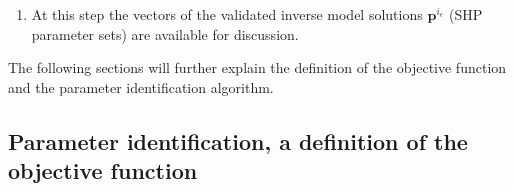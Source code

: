 \documentclass[review]{myarticle}
\newenvironment{lineq}
    {\begin{linenomath*}
    \begin{equation}
    }
    { 
    \end{equation} 
    \end{linenomath*}
    }
\renewcommand{\vec}{\mathbf}
\newcommand{\subscript}[2]{$#1 _ #2$}
\begin{document}
\begin{enumerate}[label=({\bf \roman*})]
\begin{lineq}
\begin{split}
\varepsilon^{r_f} &= 10^{-3} \; \mbox{cm} \quad  \forall r_f > 0, \\
t_{init}^{r_f} &=  10^{-8} \; \mbox{hrs} \quad  \forall r_f > 0.
\end{split}
\end{lineq}
If $r_f > 0$, then the nonlinear problem represented now by~\eqref{matice} will be solved by Schwarz-Picard method -- an adaptive domain decomposition~\citep{mojeamc2}. To validate the inverse model solution for $r_f-1$ discretization level perform the following:
  \begin{enumerate}
    \item \label{val} Compare the scatter 
   plots for the selected local extreme $i_e$ created with discretization $r_f$ and $r_f-1$. For this local extreme a vector of SHP parameters $\vec{p}_{r_f-1}^{i_e}$ is handled.  
    \item \label{cond} {\bf If} the scatter plots differ significantly  
   \begin{itemize}%
    \item Proceed the calibration  again with the new parameter range defined as $\vec{p}_{max} = 1.1\vec{p}_{r_f-1}^{i_e}$ and  $\vec{p}_{min} = 0.9\vec{p}_{r_f-1}^{i_e}$. This new calibration will update the vector  $\vec{p}_{r_f-1}^{i_e}$ to $\vec{p}_{r_f}^{i_e}$.
    \item \label{ll2} Increase the discretization level $r_f$ as $r_f=r_f+1$, perform the update~\eqref{coeffs}, return to~\ref{val}, and check the condition~\ref{cond}.
    \end{itemize}
    \item {\bf else}
    \begin{itemize}%
    \item Exit the calibration process.
    \end{itemize}
  \end{enumerate}
  \item At this step  the vectors  of the validated inverse model solutions $\vec{p}^{i_e}$ (SHP parameter sets) are available for discussion. 
\end{enumerate}


The following sections will further explain the definition of the objective function and the parameter identification algorithm.



\subsection{Parameter identification, a definition of the objective function} %
\label{objdef}
\end{document}

